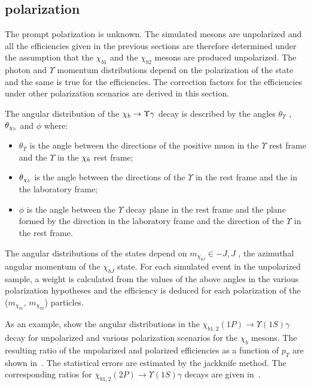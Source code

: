 \subsection{\texorpdfstring{\chib}{chib} polarization}
\label{sec:syst:pol}

The prompt \chib polarization is unknown. The simulated \chib mesons are
unpolarized and all the efficiencies given in the previous sections are
therefore determined under the assumption that the $\chi_{b1}$ and the
$\chi_{b2}$ mesons are produced unpolarized. The photon and $\Upsilon$ momentum
distributions depend on the polarization of the \chib state and the same is
true for the efficiencies. The correction factors for the 
efficiencies under other polarization scenarios are derived in this section.

The angular distribution of the $\chi_{{b}} \rightarrow \Upsilon \gamma$ decay is described
by the angles $\theta_{\Upsilon}$ , $\theta_{\chi_{{b}}}$ and $\phi$ where:
\begin{itemize}
\item $\theta_{\Upsilon}$ is the angle between the directions of the positive muon in
the $\Upsilon$ rest frame and the $\Upsilon$ in the $\chi_{{b}}$ rest frame;
\item $\theta_{\chi_{{b}}}$ is the angle between the directions of the $\Upsilon$ in the
\chib rest frame and the \chib in the laboratory frame; 
\item $\phi$ is the angle
between the $\Upsilon$ decay plane in the \chib rest frame and the plane formed
by the \chib direction in the laboratory frame and the direction of the
$\Upsilon$ in the \chib rest frame. 
\end{itemize} 
The angular distributions of the
\chib states depend on $m_{\chi_{bJ}} \in {-J, J}$ , the azimuthal angular
momentum of the $\chi_{bJ}$ state. For each simulated event in
the unpolarized sample, a weight is calculated from the values of the above 
angles in the various polarization hypotheses and the efficiency is
deduced for each polarization of the ($m_{\chi_{b1}}$, $m_{\chi_{b2}}$) particles. 

As an example,  show the angular
distributions  in the $\chi_{b1,2}(1P)\to\Upsilon(1S)\gamma$
decay for unpolarized and various polarization scenarios for the $\chi_b$ mesons. The
resulting ratio of the unpolarized and polarized efficiencies as a function of $p_T$ are shown
in~. The statistical errors are estimated by the 
jackknife method\cite{jacknife,wouter}. The corresponding ratios for
$\chi_{b1,2}(2P) \to \Upsilon(1S) \gamma$ decays are given in~.


